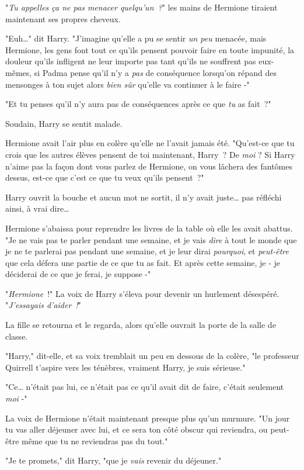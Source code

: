 "\emph{Tu appelles ça ne pas menacer quelqu'un~?}" les mains de Hermione tiraient maintenant ses propres cheveux.

"Euh…" dit Harry. "J'imagine qu'elle a pu se sentir \emph{un peu} menacée, mais Hermione, les gens font tout ce qu'ils pensent pouvoir faire en toute impunité, la douleur qu'ils infligent ne leur importe pas tant qu'ils ne souffrent pas eux-mêmes, si Padma pense qu'il n'y a \emph{pas} de conséquence lorsqu'on répand des mensonges à ton sujet alors \emph{bien sûr} qu'elle va continuer à le faire -"

"Et tu penses qu'il n'y aura pas de conséquences après ce que \emph{tu} as fait~?"

Soudain, Harry se sentit malade.

Hermione avait l'air plus en colère qu'elle ne l'avait jamais été. "Qu'est-ce que tu crois que les autres élèves pensent de toi maintenant, Harry~? De \emph{moi} ? Si Harry n'aime pas la façon dont vous parlez de Hermione, on vous lâchera des fantômes dessus, est-ce que c'est ce que tu veux qu'ils pensent~?"

Harry ouvrit la bouche et aucun mot ne sortit, il n'y avait juste… pas réfléchi ainsi, à vrai dire…

Hermione s'abaissa pour reprendre les livres de la table où elle les avait abattus. "Je ne vais pas te parler pendant une semaine, et je vais \emph{dire} à tout le monde que je ne te parlerai pas pendant une semaine, et je leur dirai \emph{pourquoi}, et \emph{peut-être} que cela défera une partie de ce que tu as fait. Et après cette semaine, je - je déciderai de ce que je ferai, je suppose -"

"\emph{Hermione}~!" La voix de Harry s'éleva pour devenir un hurlement désespéré. "\emph{J'essayais d'aider~!}"

La fille se retourna et le regarda, alors qu'elle ouvrait la porte de la salle de classe.

"Harry," dit-elle, et sa voix tremblait un peu en dessous de la colère, "le professeur Quirrell t'aspire vers les ténèbres, vraiment Harry, je suis sérieuse."

"Ce… n'était pas lui, ce n'était pas ce qu'il avait dit de faire, c'était seulement \emph{moi} -"

La voix de Hermione n'était maintenant presque plus qu'un murmure. "Un jour tu vas aller déjeuner avec lui, et ce sera ton côté obscur qui reviendra, ou peut-être même que tu ne reviendras pas du tout."

"Je te promets," dit Harry, "que je \emph{vais} revenir du déjeuner."

